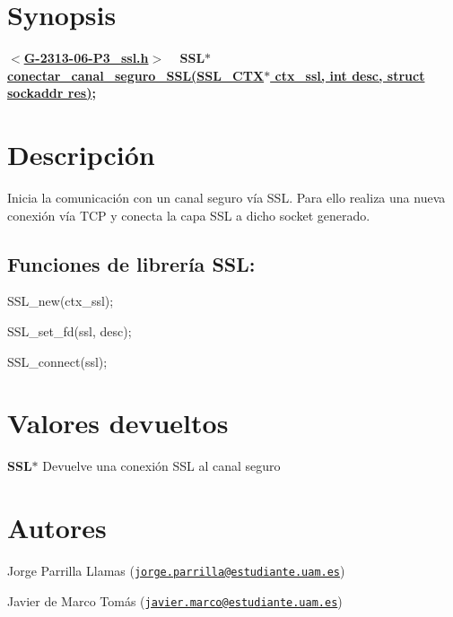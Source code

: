 \hypertarget{conectar_canal_seguro_SSL_synopsis_8}{}\section{Synopsis}\label{conectar_canal_seguro_SSL_synopsis_8}
{ {\bfseries $<$\hyperlink{G-2313-06-P3__ssl_8h}{G-\/2313-\/06-\/\+P3\+\_\+ssl.\+h}$>$} ~\newline
 {\bfseries S\+S\+L$\ast$ \hyperlink{G-2313-06-P3__ssl_8c_aa58ddc931cb106d430ab49223b9394fc}{conectar\+\_\+canal\+\_\+seguro\+\_\+\+S\+S\+L(\+S\+S\+L\+\_\+\+C\+T\+X$\ast$ ctx\+\_\+ssl, int desc, struct sockaddr res)};} } \hypertarget{conectar_canal_seguro_SSL_descripcion_8}{}\section{Descripción}\label{conectar_canal_seguro_SSL_descripcion_8}
Inicia la comunicación con un canal seguro vía S\+SL. Para ello realiza una nueva conexión vía T\+CP y conecta la capa S\+SL a dicho socket generado. ~\newline
\subsection*{{\bfseries Funciones de librería S\+SL\+:}}


\begin{DoxyItemize}
\item S\+S\+L\+\_\+new(ctx\+\_\+ssl); 
\item S\+S\+L\+\_\+set\+\_\+fd(ssl, desc); 
\item S\+S\+L\+\_\+connect(ssl); 
\end{DoxyItemize}\hypertarget{conectar_canal_seguro_SSL_return_7}{}\section{Valores devueltos}\label{conectar_canal_seguro_SSL_return_7}

\begin{DoxyItemize}
\item {\bfseries S\+S\+L$\ast$} Devuelve una conexión S\+SL al canal seguro  
\end{DoxyItemize}\hypertarget{conectar_canal_seguro_SSL_authors_7}{}\section{Autores}\label{conectar_canal_seguro_SSL_authors_7}

\begin{DoxyItemize}
\item Jorge Parrilla Llamas (\href{mailto:jorge.parrilla@estudiante.uam.es}{\tt jorge.\+parrilla@estudiante.\+uam.\+es}) 
\item Javier de Marco Tomás (\href{mailto:javier.marco@estudiante.uam.es}{\tt javier.\+marco@estudiante.\+uam.\+es}) 
\end{DoxyItemize}